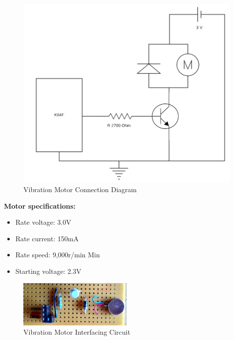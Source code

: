 \documentclass[12pt,a4paper]{article}
\begin{document}
		\begin{figure}[h]
			\centering
			\includegraphics[scale=0.3]{motor_diag1.png}
			\caption{Vibration Motor Connection Diagram}
			\label{fig:vibMotorConnDiag}
		\end{figure}
        
		{\bfseries Motor specifications:}
		\begin{itemize}
			\item Rate voltage: 3.0V
			\item Rate current: 150mA
			\item Rate speed: 9,000r/min Min
			\item Starting voltage: 2.3V
		\end{itemize}
		
        \begin{figure}[h]
         \centering
         \includegraphics[width=0.5\textwidth]{circuit1.jpg}
         \caption{Vibration Motor Interfacing Circuit}
         \label{fig:vibMotIC}
        \end{figure}
        \newpage
		
\end{document}
